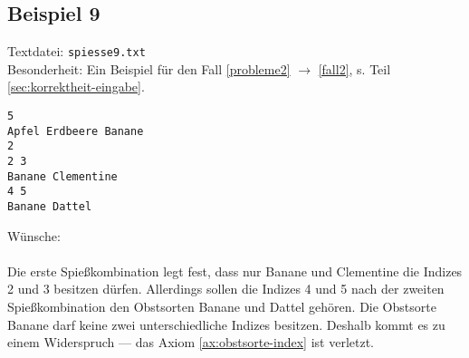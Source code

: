 \newpage
\subsection{Beispiel 9}\label{example:9}
Textdatei: \texttt{spiesse9.txt}\\
Besonderheit: Ein Beispiel für den Fall \ref{probleme2} $\rightarrow$ \ref{fall2}, s. Teil \ref{sec:korrektheit-eingabe}.
\begin{verbatim}
5
Apfel Erdbeere Banane
2
2 3
Banane Clementine
4 5
Banane Dattel
\end{verbatim}

\noindent
Wünsche: \\

\noindent
{}\\

Die erste Spießkombination legt fest, dass nur Banane und Clementine die Indizes 2 und 3 besitzen dürfen.
Allerdings sollen die Indizes 4 und 5 nach der zweiten Spießkombination den Obstsorten Banane und Dattel 
gehören. Die Obstsorte Banane darf keine zwei unterschiedliche Indizes besitzen.
Deshalb kommt es zu einem Widerspruch --- das Axiom \ref{ax:obstsorte-index} ist verletzt.